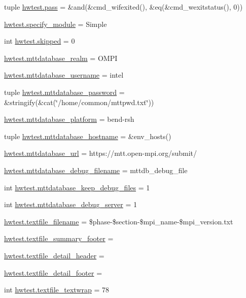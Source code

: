 \begin{DoxyCompactItemize}
tuple \hyperlink{namespacehwtest_aba9f32241019e8b74b8155d5fe25a326}{hwtest.\-pass} = \&and(\&cmd\-\_\-wifexited(), \&eq(\&cmd\-\_\-wexitstatus(), 0))
\item 
\hyperlink{namespacehwtest_a776d2af9b2bb100b49d3709b6e256797}{hwtest.\-specify\-\_\-module} = Simple
\item 
int \hyperlink{namespacehwtest_a52e9a2d299cf53080aa90654ddcaf209}{hwtest.\-skipped} = 0
\item 
\hyperlink{namespacehwtest_a06dff656b8aa4743a2d09ea2a47e088b}{hwtest.\-mttdatabase\-\_\-realm} = O\-M\-P\-I
\item 
\hyperlink{namespacehwtest_a78763492ac95e935dc66de47a7b24374}{hwtest.\-mttdatabase\-\_\-username} = intel
\item 
tuple \hyperlink{namespacehwtest_a62683e098488d08966d4a339bb945d9c}{hwtest.\-mttdatabase\-\_\-password} = \&stringify(\&cat(\char`\"{}/home/common/mttpwd.\-txt\char`\"{}))
\item 
\hyperlink{namespacehwtest_afe5c3aa0d87e5e74558741e81b9d39ce}{hwtest.\-mttdatabase\-\_\-platform} = bend-\/rsh
\item 
tuple \hyperlink{namespacehwtest_a2561ee660a1987af3681c21d61bce282}{hwtest.\-mttdatabase\-\_\-hostname} = \&env\-\_\-hosts()
\item 
\hyperlink{namespacehwtest_a4a582498db594ca409429642d4690a1d}{hwtest.\-mttdatabase\-\_\-url} = https\-://mtt.\-open-\/mpi.\-org/submit/
\item 
\hyperlink{namespacehwtest_aaf511fc503606c1808a06d8da809263e}{hwtest.\-mttdatabase\-\_\-debug\-\_\-filename} = mttdb\-\_\-debug\-\_\-file
\item 
int \hyperlink{namespacehwtest_a4038849f56dda68ae47f22d2945ddf21}{hwtest.\-mttdatabase\-\_\-keep\-\_\-debug\-\_\-files} = 1
\item 
int \hyperlink{namespacehwtest_a1da4b943796a82979729d658ea0e913d}{hwtest.\-mttdatabase\-\_\-debug\-\_\-server} = 1
\item 
\hyperlink{namespacehwtest_ad10ebcdde85ff5608f5b974987766b82}{hwtest.\-textfile\-\_\-filename} = \$phase-\/\$section-\/\$mpi\-\_\-name-\/\$mpi\-\_\-version.\-txt
\item 
\hyperlink{namespacehwtest_a75ec114b65b92671173085f162edb84f}{hwtest.\-textfile\-\_\-summary\-\_\-footer} =
\item 
\hyperlink{namespacehwtest_ae80f390eb87caf3467f8b53883932b9f}{hwtest.\-textfile\-\_\-detail\-\_\-header} =
\item 
\hyperlink{namespacehwtest_acf23440e8c05d17e5b3bb0c6a6a7a12a}{hwtest.\-textfile\-\_\-detail\-\_\-footer} =
\item 
int \hyperlink{namespacehwtest_ae9e1387323c72cd6970ef27480e3ea21}{hwtest.\-textfile\-\_\-textwrap} = 78
\end{DoxyCompactItemize}
